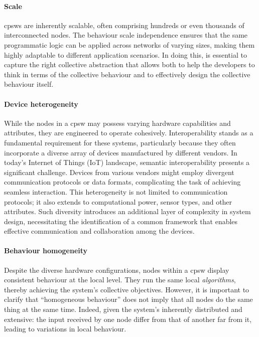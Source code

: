 \paragraph*{Scale}
\acp{cpsw} are inherently scalable, 
 often comprising hundreds or even thousands of interconnected nodes. 
 The behaviour scale independence ensures that the same programmatic logic can be applied across networks of varying sizes, 
 making them highly adaptable to different application scenarios.
 In doing this, is essential to capture the right collective abstraction that 
 allows both to help the developers to think in terms of the collective behaviour
 and to effectively design the collective behaviour itself.

\paragraph*{Device heterogeneity}
While the nodes in a \ac{cpsw} may possess varying hardware capabilities and attributes, they are engineered to operate cohesively. 
 Interoperability stands as a fundamental requirement for these systems, 
 particularly because they often incorporate a diverse array of devices manufactured by different vendors.
%
In today's Internet of Things (IoT) landscape, 
 semantic interoperability presents a significant challenge. 
 Devices from various vendors might employ divergent communication protocols or data formats, complicating the task of achieving seamless interaction. 
 This heterogeneity is not limited to communication protocols; 
 it also extends to computational power, sensor types, and other attributes. 
 Such diversity introduces an additional layer of complexity in system design, 
 necessitating the identification of a common framework that enables effective communication and collaboration among the devices.
\paragraph*{Behaviour homogeneity}
Despite the diverse hardware configurations, 
 nodes within a \ac{cpsw} display consistent behaviour at the local level.
 They run the same local \emph{algorithms}, thereby achieving the system's collective objectives.
 However, it is important to clarify that ``homogeneous behaviour'' does not imply that all nodes do the same thing at the same time.
 Indeed, given the system's inherently distributed and extensive: 
 the input received by one node differ from that of another far from it, 
 leading to variations in local behaviour.

